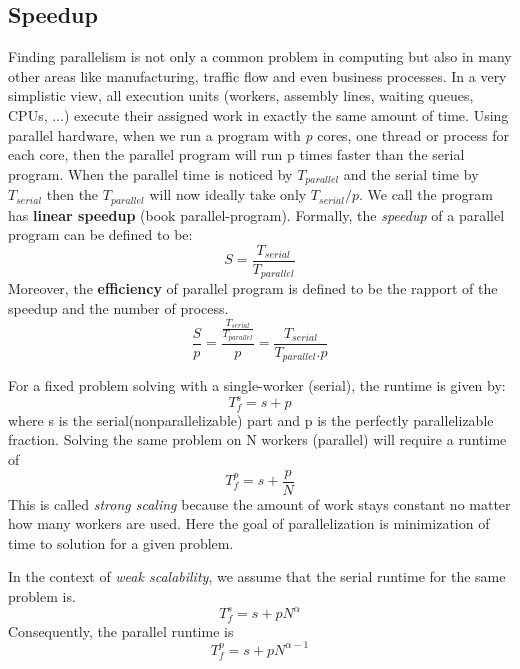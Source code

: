 \subsection{Speedup} 
Finding parallelism is not only a common problem in computing but also in many other areas like manufacturing, traffic flow and even business processes. In a very simplistic view, all execution units (workers, assembly lines, waiting queues, CPUs, ...) execute their assigned work in exactly the same amount of time. \newline
Using parallel hardware, when we run a program with \textit{p} cores, one thread or process for each core, then the parallel program will run p times faster than the serial program. When the parallel time is noticed by $T_{parallel}$ and the serial time by $T_{serial}$ then the $T_{parallel}$ will now ideally take only $T_{serial}/p$. We call the program has \textbf{linear speedup} (book parallel-program). \newline
Formally, the \textit{speedup} of a parallel program can be defined to be:
\begin{equation}
S = \frac{T_{serial}}{T_{parallel}}
\end{equation} 
Moreover, the \textbf{efficiency} of parallel program is defined to be the rapport of the speedup and the number of process.
\begin{equation}
\frac{S}{p} = \frac{\frac{T_{serial}}{T_{parallel}}}{p} = \frac{T_{serial}}{T_{parallel}.p}
\end{equation} 

For a fixed problem solving with a single-worker (serial), the runtime is given by:
\begin{equation}
T_{f}^{s} = s + p 
\end{equation}
where s is the serial(nonparallelizable) part and p is the perfectly parallelizable fraction. \newline
Solving the same problem on N workers (parallel) will require a runtime of
\begin{equation}
T_{f}^{p} = s + \frac{p}{N}
\end{equation}
This is called \textit{strong scaling} because the amount of work stays constant no matter how many workers are used. Here the goal of parallelization is minimization of time to solution for a given problem.

In the context of \textit{weak scalability}, we assume that the serial runtime for the same problem is.
\begin{equation}
T_{f}^{s} = s + pN^{\alpha} 
\end{equation}
Consequently, the parallel runtime is
\begin{equation}
T_{f}^{p} = s + pN^{\alpha - 1} 
\end{equation}
